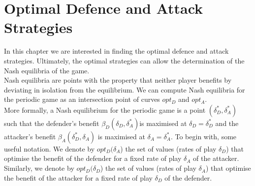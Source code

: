 \chapter{Optimal Defence and Attack Strategies}
\label{chapter:Nash}
%



In this chapter we are interested in finding the optimal defence and attack strategies. Ultimately, the optimal strategies can allow the determination of the Nash equilibria of the game. \\


Nash equilibria are points with the property that neither player benefits by deviating in isolation from the equilibrium. We can compute Nash equilibria for the periodic game as an intersection point of curves $opt_{D}$ and $opt_{A}$. 
\\
More formally, a Nash equilibrium for the periodic game is a point $(\delta_{D}^{*},\delta_{A}^{*})$ such that
the defender's benefit $\beta_{D}(\delta_{D},\delta_{A}^{*}) $is maximised at $\delta_{D}= \delta_{D}^{*}$ and the attacker's benefit
$\beta_{A}(\delta_{D}^{*},\delta_{A}) $ is maximised at $\delta_{A}= \delta_{A}^{*}$.
To begin with, some useful notation. We denote by $opt_{D}(\delta_{A}$) the set of values (rates
of play $\delta_{D}$) that optimise the benefit of the defender for a fixed rate of play $\delta_{A}$ of the
attacker. Similarly, we denote by $opt_{D}(\delta_{D}$) the set of values (rates of play $\delta_{A}$) that optimise
the benefit of the attacker for a fixed rate of play $\delta_{D}$ of the defender. \\



